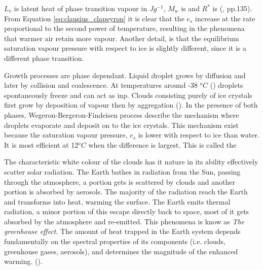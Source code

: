 $L_v$ is latent heat of phase transition vapour in $J g^{-1}$, $M_w$ is and $R^*$ is (\cite{cloud_phys_book_johanne}, pp.135). From Equation \eqref{eq:clausius_clapeyron} it is clear that the $e_s$ increase at the rate proportional to the second power of temperature, resulting in the phenomena that warmer air retain more vapour. Another detail, is that the equilibrium saturation vapour pressure with respect to ice is slightly different, since it is a different phase transition.


Growth processes are phase dependant. Liquid droplet grows by diffusion and later by collision and coalescence. At temperatures around -38 $^oC$ (\cite{lohmann2016}) droplets spontaneously freeze and can act as \acrshort{inp}. Clouds consisting purely of ice crystals first grow by deposition of vapour then by aggregation (\cite{Fowler1996LiquidAssumptions}). In the presence of both phases, Wegeron-Bergeron-Findeisen process describe the mechanism where droplets evaporate and deposit on to the ice crystals. %
This mechanism exist because the saturation vapour pressure, $e_s$ is lower with respect to ice than water. It is most efficient at 12$^oC$ when the difference is largest. This is called the 

The characteristic white colour of the clouds has it nature in its ability effectively scatter solar radiation. %
The Earth bathes in radiation from the Sun, passing through the atmosphere, a portion gets is scattered by clouds and another portion is absorbed by aerosols. The majority of the radiation reach the Earth and transforms into heat, warming the surface. The Earth emits thermal radiation, a minor portion of this escape directly back to space, most of it gets absorbed by the atmosphere and re-emitted. This phenomena is know as \textit{The greenhouse effect}. The amount of heat trapped in the Earth system depends fundamentally on the spectral properties of its components (i.e. clouds, greenhouse gases, aerosols), and determines the magnitude of the enhanced warming.  (\cite{greenhouse_effect}). 

